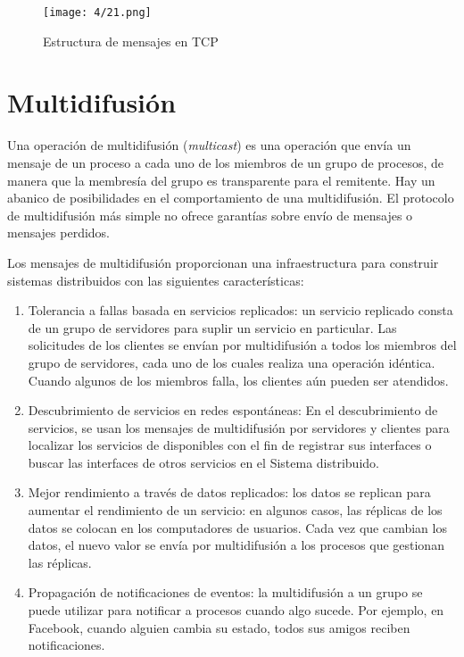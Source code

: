 \begin{figure} 
	  \begin{center}
	\texttt{[image: 4/21.png]}
	\caption{Estructura de mensajes en TCP}
	\label{fig:TCP-seg-estruc}
\end{center} 
 \end{figure}
 


\section{Multidifusi\'on }

Una operación de multidifusión (\textit{multicast}) es  una operación que envía un   mensaje de un proceso a cada uno de los miembros de un grupo de procesos, de manera que la membresía  del grupo es transparente para el remitente. Hay un abanico de posibilidades en el   comportamiento de una multidifusión. El protocolo de multidifusión más simple no ofrece garantías sobre  envío de mensajes o mensajes perdidos.

Los mensajes de multidifusión proporcionan una infraestructura  para construir sistemas distribuidos  con las siguientes características:
\begin{enumerate}
	\item  Tolerancia a fallas basada en servicios replicados: un servicio replicado consta de un  grupo de servidores para suplir un servicio en particular. Las solicitudes de los clientes se envían por multidifusión a todos los miembros del grupo de servidores,  cada uno de los cuales realiza una operación idéntica. Cuando algunos de los miembros
	falla, los clientes aún pueden ser atendidos.  
	
	\item Descubrimiento de servicios en redes espontáneas: En el \gls{descubrimiento de servicios}, se usan los mensajes de multidifusión por servidores y clientes para localizar los servicios de  disponibles con el fin de  registrar sus interfaces o buscar las interfaces de otros servicios en el  Sistema distribuido.  
	
	\item  Mejor rendimiento a través de datos replicados: los datos se replican para aumentar el  rendimiento de un servicio: en algunos casos, las réplicas de los datos se colocan en los computadores de usuarios. Cada vez que cambian los datos, el nuevo valor se envía por multidifusión a los procesos que gestionan las réplicas.  
	
	\item Propagación de notificaciones de eventos: la multidifusión a un grupo se puede utilizar para notificar  a procesos cuando algo sucede. Por ejemplo, en Facebook, cuando alguien  cambia su estado, todos sus amigos reciben notificaciones.   
	
\end{enumerate}
